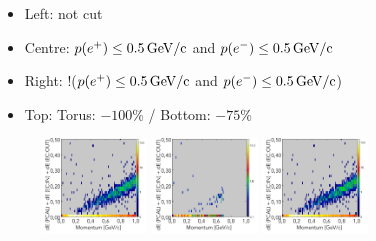 \documentclass[xcolor=table, xcolor=dvipsnames]{beamer}
\begin{document}
\begin{frame}
        \begin{itemize}
          \item Left: not cut 
          \item Centre: $p(e^+) \le 0.5\,\rm{GeV/c}$ and $p(e^-) \le 0.5\,\rm{GeV/c}$ 
          \item  Right: !($p(e^+) \le 0.5\,\rm{GeV/c}$ and $p(e^-) \le 0.5\,\rm{GeV/c}$)
          \item Top: Torus: $-100\%$ / Bottom: $-75\%$
        \end{itemize}
 \end{frame}
    
\begin{frame}
        \begin{figure}
          \includegraphics[width=0.25\textwidth,origin=l]{triggerStudies_Tor1_CAL.png}
          \includegraphics[width=0.25\textwidth]{triggerStudies_Tor1_cut07_CAL_IN.png}
          \includegraphics[width=0.25\textwidth,origin=r]{triggerStudies_Tor1_cut07_CAL_OUT.png}\\
            

\end{figure}
\end{frame}
\end{document}
